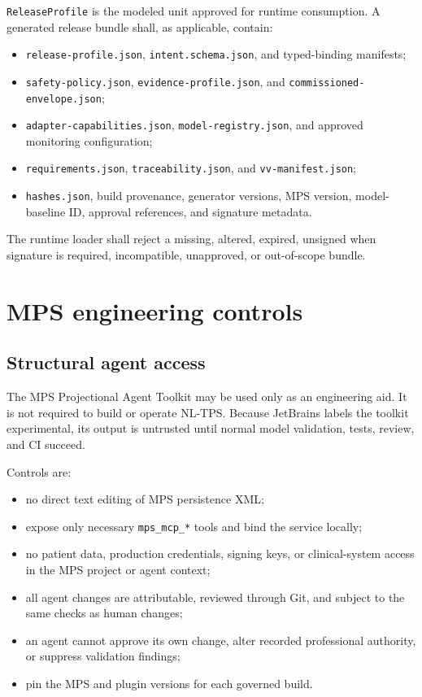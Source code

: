 \documentclass[11pt,letterpaper]{article}
\begin{document}
\texttt{ReleaseProfile} is the modeled unit approved for runtime consumption. A generated release bundle shall, as applicable, contain:

\begin{itemize}
\item \texttt{release-profile.json}, \texttt{intent.schema.json}, and typed-binding manifests;
\item \texttt{safety-policy.json}, \texttt{evidence-profile.json}, and \texttt{commissioned-envelope.json};
\item \texttt{adapter-capabilities.json}, \texttt{model-registry.json}, and approved monitoring configuration;
\item \texttt{requirements.json}, \texttt{traceability.json}, and \texttt{vv-manifest.json};
\item \texttt{hashes.json}, build provenance, generator versions, MPS version, model-baseline ID, approval references, and signature metadata.
\end{itemize}

The runtime loader shall reject a missing, altered, expired, unsigned when signature is required, incompatible, unapproved, or out-of-scope bundle.

\section{MPS engineering controls}

\subsection{Structural agent access}

The MPS Projectional Agent Toolkit may be used only as an engineering aid. It is not required to build or operate NL-TPS. Because JetBrains labels the toolkit experimental, its output is untrusted until normal model validation, tests, review, and CI succeed.

Controls are:

\begin{itemize}
\item no direct text editing of MPS persistence XML;
\item expose only necessary \texttt{mps\_mcp\_*} tools and bind the service locally;
\item no patient data, production credentials, signing keys, or clinical-system access in the MPS project or agent context;
\item all agent changes are attributable, reviewed through Git, and subject to the same checks as human changes;
\item an agent cannot approve its own change, alter recorded professional authority, or suppress validation findings;
\item pin the MPS and plugin versions for each governed build.
\end{itemize}
\end{document}
